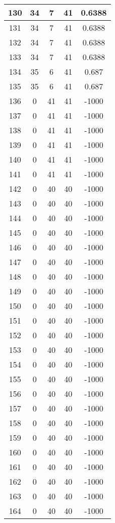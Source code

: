 \documentclass[letterpaper, 12pt]{article}
\begin{document}
\begin{longtable}{|c|c|c|c|c|}
\hline
130 & 34 & 7 & 41 & 0.6388 \\
\hline
131 & 34 & 7 & 41 & 0.6388 \\
\hline
132 & 34 & 7 & 41 & 0.6388 \\
\hline
133 & 34 & 7 & 41 & 0.6388 \\
\hline
134 & 35 & 6 & 41 & 0.687 \\
\hline
135 & 35 & 6 & 41 & 0.687 \\
\hline
136 & 0 & 41 & 41 & -1000 \\
\hline
137 & 0 & 41 & 41 & -1000 \\
\hline
138 & 0 & 41 & 41 & -1000 \\
\hline
139 & 0 & 41 & 41 & -1000 \\
\hline
140 & 0 & 41 & 41 & -1000 \\
\hline
141 & 0 & 41 & 41 & -1000 \\
\hline
142 & 0 & 40 & 40 & -1000 \\
\hline
143 & 0 & 40 & 40 & -1000 \\
\hline
144 & 0 & 40 & 40 & -1000 \\
\hline
145 & 0 & 40 & 40 & -1000 \\
\hline
146 & 0 & 40 & 40 & -1000 \\
\hline
147 & 0 & 40 & 40 & -1000 \\
\hline
148 & 0 & 40 & 40 & -1000 \\
\hline
149 & 0 & 40 & 40 & -1000 \\
\hline
150 & 0 & 40 & 40 & -1000 \\
\hline
151 & 0 & 40 & 40 & -1000 \\
\hline
152 & 0 & 40 & 40 & -1000 \\
\hline
153 & 0 & 40 & 40 & -1000 \\
\hline
154 & 0 & 40 & 40 & -1000 \\
\hline
155 & 0 & 40 & 40 & -1000 \\
\hline
156 & 0 & 40 & 40 & -1000 \\
\hline
157 & 0 & 40 & 40 & -1000 \\
\hline
158 & 0 & 40 & 40 & -1000 \\
\hline
159 & 0 & 40 & 40 & -1000 \\
\hline
160 & 0 & 40 & 40 & -1000 \\
\hline
161 & 0 & 40 & 40 & -1000 \\
\hline
162 & 0 & 40 & 40 & -1000 \\
\hline
163 & 0 & 40 & 40 & -1000 \\
\hline
164 & 0 & 40 & 40 & -1000 \\

\end{longtable}
\end{document}
